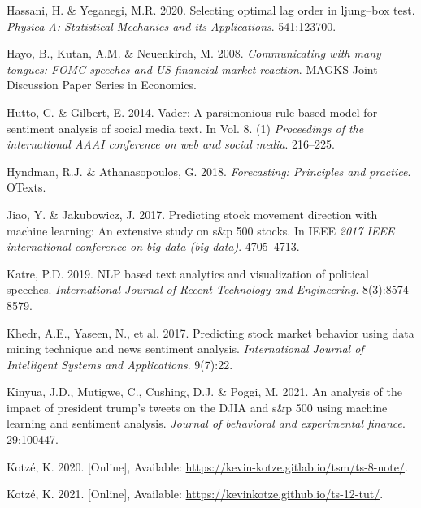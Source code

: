 \documentclass[11pt,preprint, authoryear]{elsarticle}
\numberwithin{equation}{section}
\numberwithin{figure}{section}
\numberwithin{table}{section}
\newlength{\cslhangindent}
\newenvironment{CSLReferences}%
  {\setlength{\parindent}{0pt}%
  \everypar{\setlength{\hangindent}{\cslhangindent}}\ignorespaces}%
  {\par}
\begin{document}
\begin{CSLReferences}{1}{0}
\leavevmode{}%
Hassani, H. \& Yeganegi, M.R. 2020. Selecting optimal lag order in
ljung--box test. \emph{Physica A: Statistical Mechanics and its
Applications}. 541:123700.

\leavevmode{}%
Hayo, B., Kutan, A.M. \& Neuenkirch, M. 2008. \emph{Communicating with
many tongues: FOMC speeches and US financial market reaction}. MAGKS
Joint Discussion Paper Series in Economics.

\leavevmode{}%
Hutto, C. \& Gilbert, E. 2014. Vader: A parsimonious rule-based model
for sentiment analysis of social media text. In Vol. 8. (1)
\emph{Proceedings of the international AAAI conference on web and social
media}. 216--225.

\leavevmode{}%
Hyndman, R.J. \& Athanasopoulos, G. 2018. \emph{Forecasting: Principles
and practice}. OTexts.

\leavevmode{}%
Jiao, Y. \& Jakubowicz, J. 2017. Predicting stock movement direction
with machine learning: An extensive study on s\&p 500 stocks. In IEEE
\emph{2017 IEEE international conference on big data (big data)}.
4705--4713.

\leavevmode{}%
Katre, P.D. 2019. NLP based text analytics and visualization of
political speeches. \emph{International Journal of Recent Technology and
Engineering}. 8(3):8574--8579.

\leavevmode{}%
Khedr, A.E., Yaseen, N., et al. 2017. Predicting stock market behavior
using data mining technique and news sentiment analysis.
\emph{International Journal of Intelligent Systems and Applications}.
9(7):22.

\leavevmode{}%
Kinyua, J.D., Mutigwe, C., Cushing, D.J. \& Poggi, M. 2021. An analysis
of the impact of president trump's tweets on the DJIA and s\&p 500 using
machine learning and sentiment analysis. \emph{Journal of behavioral and
experimental finance}. 29:100447.

\leavevmode{}%
Kotzé, K. 2020. {[}Online{]}, Available:
\url{https://kevin-kotze.gitlab.io/tsm/ts-8-note/}.

\leavevmode{}%
Kotzé, K. 2021. {[}Online{]}, Available:
\url{https://kevinkotze.github.io/ts-12-tut/}.


\end{CSLReferences}
\end{document}

